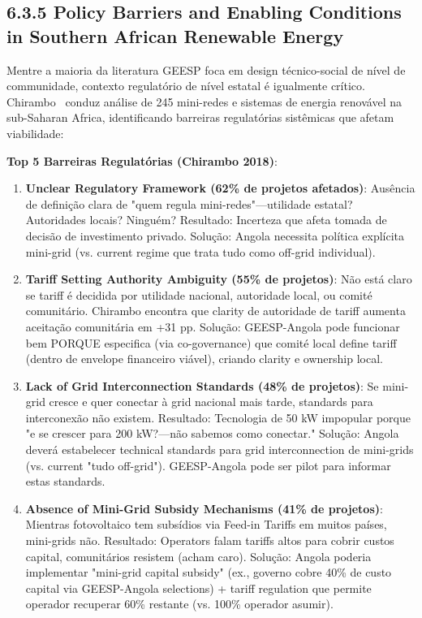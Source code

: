 \documentclass[12pt, a4paper]{article}
\begin{document}
\subsection*{6.3.5 Policy Barriers and Enabling Conditions in Southern African Renewable Energy}

Mentre a maioria da literatura GEESP foca em design técnico-social de nível de communidade, contexto regulatório de nível estatal é igualmente crítico. Chirambo~\citep{Chirambo2018} conduz análise de 245 mini-redes e sistemas de energia renovável na sub-Saharan Africa, identificando barreiras regulatórias sistêmicas que afetam viabilidade:

\textbf{Top 5 Barreiras Regulatórias (Chirambo 2018)}:
\begin{enumerate}
\item \textbf{Unclear Regulatory Framework (62\% de projetos afetados)}: Ausência de definição clara de "quem regula mini-redes"—utilidade estatal? Autoridades locais? Ninguém? Resultado: Incerteza que afeta tomada de decisão de investimento privado. Solução: Angola necessita política explícita mini-grid (vs. current regime que trata tudo como off-grid individual).

\item \textbf{Tariff Setting Authority Ambiguity (55\% de projetos)}: Não está claro se tariff é decidida por utilidade nacional, autoridade local, ou comité comunitário. Chirambo encontra que clarity de autoridade de tariff aumenta aceitação comunitária em +31 pp. Solução: GEESP-Angola pode funcionar bem PORQUE especifica (via co-governance) que comité local define tariff (dentro de envelope financeiro viável), criando clarity e ownership local.

\item \textbf{Lack of Grid Interconnection Standards (48\% de projetos)}: Se mini-grid cresce e quer conectar à grid nacional mais tarde, standards para interconexão não existem. Resultado: Tecnologia de 50 kW impopular porque "e se crescer para 200 kW?—não sabemos como conectar." Solução: Angola deverá estabelecer technical standards para grid interconnection de mini-grids (vs. current "tudo off-grid"). GEESP-Angola pode ser pilot para informar estas standards.

\item \textbf{Absence of Mini-Grid Subsidy Mechanisms (41\% de projetos)}: Mientras fotovoltaico tem subsídios via Feed-in Tariffs em muitos países, mini-grids não. Resultado: Operators falam tariffs altos para cobrir custos capital, comunitários resistem (acham caro). Solução: Angola poderia implementar "mini-grid capital subsidy" (ex., governo cobre 40\% de custo capital via GEESP-Angola selections) + tariff regulation que permite operador recuperar 60\% restante (vs. 100\% operador asumir).


\end{enumerate}
\end{document}
